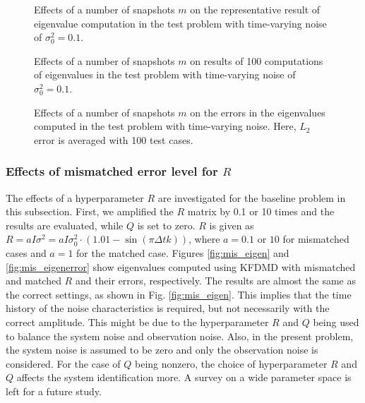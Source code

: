 \documentclass[aip,graphicx]{revtex4-1}
\begin{document}
\begin{figure}
	    \caption{Effects of a number of snapshots $m$  on the representative result of eigenvalue computation in the test problem with time-varying noise of $\sigma_0^2=0.1$.}	
	\label{fig:diffm_eigenexam}
\end{figure}
\begin{figure}
	
	    \caption{Effects of a number of snapshots $m$  on results of 100 computations of eigenvalues in the test problem with time-varying noise of $\sigma_0^2=0.1$.}	
	\label{fig:diffm_eigen}
\end{figure}

\begin{figure}
   \caption{Effects of a number of snapshots $m$ on the errors in the eigenvalues computed in the test problem with time-varying noise. Here, $L_2$ error is averaged with 100 test cases. }	
	\label{fig:diffm_eigenerror}
\end{figure}


\subsubsection{Effects of mismatched error level for $R$}
\label{sec:EME}
The effects of a hyperparameter $R$ are investigated for the baseline problem in this subsection. First, we amplified the $R$ matrix by 0.1 or 10 times and the results are evaluated, while $Q$ is set to zero.  $R$ is given as  $R=aI\sigma^2 = aI\sigma_0^2 \cdot \left( 1.01 - \sin\left( \pi \Delta t k\right)\right)$, where $a = 0.1$ or $10$ for mismatched cases and $a=1$ for the matched case. Figures \ref{fig:mis_eigen} and \ref{fig:mis_eigenerror} show eigenvalues computed using KFDMD with mismatched and matched $R$ and their errors, respectively. The results are almost the same as the correct settings, as shown in Fig. \ref{fig:mis_eigen}. This implies that the time history of the noise characteristics is required, but not necessarily with the correct amplitude. This might be due to the hyperparameter $R$ and $Q$ being used to balance the system noise and observation noise. Also, in the present problem, the system noise is assumed to be zero and only the observation noise is considered.  For the case of $Q$ being nonzero, the choice of hyperparameter $R$ and $Q$ affects the system identification more. A survey on a wide parameter space is left for a future study. 
\end{document}
